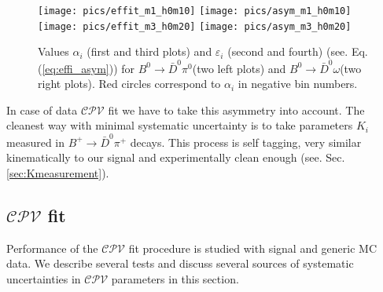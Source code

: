 \documentclass[preprint,aps,showpacs]{revtex4}
\newcommand{\cpvconj}{\ensuremath{\mathcal{CPV}}\xspace}
\newcommand{\bdpi}{\ensuremath{B^0\to \bar D^0\pi^0}\xspace}
\newcommand{\bdomega}{\ensuremath{B^0\to \bar D^0\omega}\xspace}
\newcommand{\bptodpi}{\ensuremath{B^{+}\to \bar D^0\pi^+}\xspace}
\begin{document}
\begin{figure}[htb]
 \texttt{[image: pics/effit\_m1\_h0m10]}
 \texttt{[image: pics/asym\_m1\_h0m10]}
 \texttt{[image: pics/effit\_m3\_h0m20]}
 \texttt{[image: pics/asym\_m3\_h0m20]}
 \caption{Values $\alpha_i$ (first and third plots) and $\varepsilon_i$ (second and fourth) (see. Eq.\,(\ref{eq:effi_asym})) for \bdpi (two left plots) and \bdomega (two right plots). Red circles correspond to $\alpha_i$ in negative bin numbers.}
 \label{fig:asym}
\end{figure}

In case of data \cpvconj fit we have to take this asymmetry into account. The cleanest way with minimal systematic uncertainty is to take parameters $K_i$ measured in \bptodpi decays. This process is self tagging, very similar kinematically to our signal and experimentally clean enough (see. Sec.\,\ref{sec:Kmeasurement}).

\clearpage
\subsection{\cpvconj fit}\label{sec:mc_cpv_fit}
Performance of the \cpvconj fit procedure is studied with signal and generic MC data. We describe several tests and discuss several sources of systematic uncertainties in \cpvconj parameters in this section.
\end{document}
